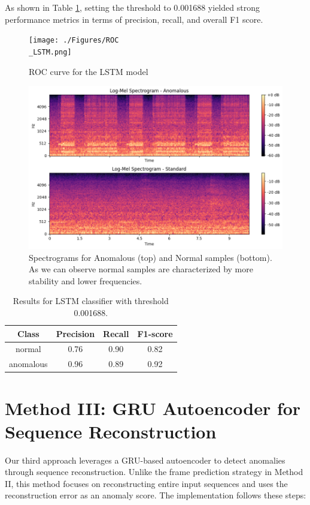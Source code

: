 \documentclass[ngerman]{scrartcl}
\begin{document}
As shown in Table \ref{tab:results}, setting the threshold to 0.001688 yielded strong performance metrics in terms of precision, recall, and overall F1 score.

\begin{figure}[h]
    \centering
    \texttt{[image: ./Figures/ROC\\\_LSTM.png]}
    \caption{ROC curve for the LSTM model}
    \label{fig:rocLSTM}
\end{figure}

\begin{figure}[h]
    \centering
    \includegraphics[width=.5\textwidth]{./Figures/spectograms.png}
    \caption{Spectrograms for Anomalous (top) and Normal samples (bottom). As we can observe normal samples are characterized by more stability and lower frequencies.}
    \label{fig:spectograms}
\end{figure}


\begin{table}[h]
    \centering
    \begin{tabular}{|c|c|c|c|}
        \hline
        Class & Precision & Recall & F1-score \\
        \hline
        normal  & 0.76  & 0.90   & 0.82   \\
        anomalous  & 0.96  & 0.89  & 0.92  \\
        \hline
    \end{tabular}
    \caption{Results for LSTM classifier with threshold 0.001688.}
    \label{tab:results}
\end{table}

\section{Method III: GRU Autoencoder for Sequence Reconstruction}

Our third approach leverages a GRU-based autoencoder to detect anomalies through sequence reconstruction. Unlike the frame prediction strategy in Method II, this method focuses on reconstructing entire input sequences and uses the reconstruction error as an anomaly score. The implementation follows these steps:
\end{document}
